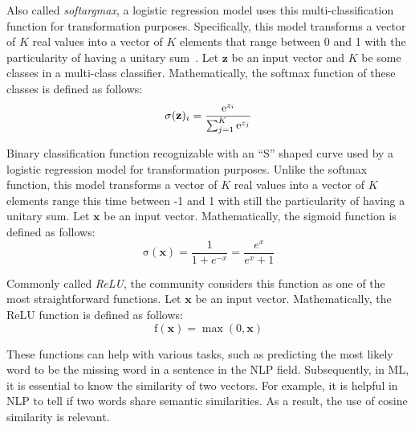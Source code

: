 \begin{definition}
  Also called \emph{softargmax}, a logistic regression model uses this
  multi-classification function for transformation purposes. Specifically, this
  model transforms a vector of $K$ real values into a vector of $K$ elements that
  range between 0 and 1 with the particularity of having a unitary
  sum~\citep{website:deepai:softmax}. Let $\mathbf{z}$ be an input vector and $K$
  be some classes in a multi-class classifier. Mathematically, the softmax
  function of these classes is defined as follows:
  \begin{equation}
    \mathrm{\sigma}(\mathbf{z})_i = \frac{\mathrm{e}^{z_i}}{\sum^K_{j=1}\mathrm{e}^{z_j}}
    \label{eq:softmax}
  \end{equation}
  \label{def:softmax}
\end{definition}

\begin{definition}
  Binary classification function recognizable with an ``S'' shaped curve used by
  a logistic regression model for transformation purposes. Unlike the softmax
  function, this model transforms a vector of $K$ real values into a vector of $K$
  elements range this time between -1 and 1 with still the particularity of having
  a unitary sum. Let $\mathbf{x}$ be an input vector. Mathematically, the
  sigmoid function is defined as follows:
  \begin{equation}
    \mathrm{\sigma}(\mathbf{x}) = \frac{1}{1 + e^{-x}} = \frac{e^x}{e^x + 1}
    \label{eq:sigmoid}
  \end{equation}
  \label{def:sigmoid}
\end{definition}

\begin{definition}
  Commonly called \emph{ReLU}, the community considers this function as one of
  the most straightforward functions. Let $\mathbf{x}$ be an input
  vector. Mathematically, the ReLU function is defined as follows:
  \begin{equation}
    \mathrm{f}(\mathbf{x}) = \max(0, \mathbf{x})
    \label{eq:relu}
  \end{equation}
  \label{def:relu}
\end{definition}

\noindent These functions can help with various tasks, such as predicting the
most likely word to be the missing word in a sentence in the NLP
field. Subsequently, in ML, it is essential to know the similarity of two
vectors. For example, it is helpful in NLP to tell if two words share semantic
similarities. As a result, the use of cosine similarity is relevant.

